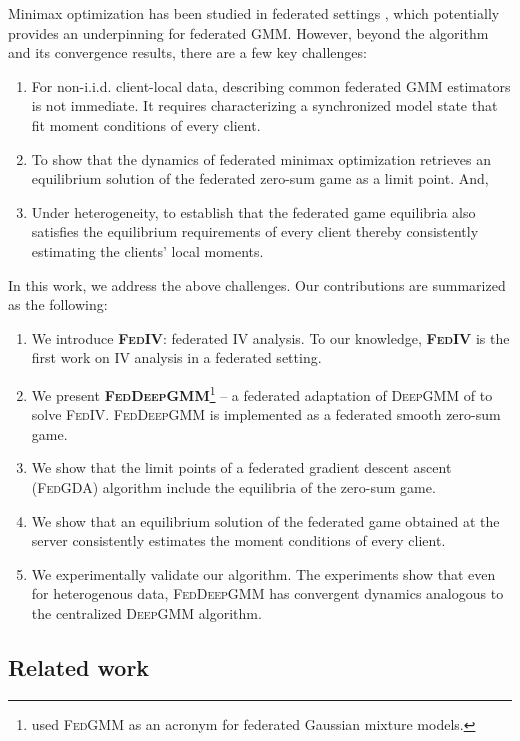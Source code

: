 \documentclass{article}
\let\cite\relax
\newcommand*{\cite}{\citep}
\newcommand{\fv}{\textsc{FedIV}\xspace}
\newcommand{\dgmm}{\textsc{DeepGMM}\xspace}
\newcommand{\fdgmm}{\textsc{FedDeepGMM}\xspace}
\newcommand{\fgda}{\textsc{FedGDA}\xspace}
\theoremstyle{definition}
\begin{document}
Minimax optimization has been studied in federated settings \cite{sharma2022federated, wu2024solving}, which potentially provides an underpinning for federated GMM. However, beyond the algorithm and its convergence results, there are a few key challenges: 
\begin{enumerate}[label=(\Alph*),parsep=0pt,topsep=0pt,leftmargin=*,itemsep=0pt]
\item For non-i.i.d. client-local data, describing common federated GMM estimators is not immediate. It requires characterizing a synchronized model state that fit moment conditions of every client.
\item To show that the dynamics of federated minimax optimization retrieves an equilibrium solution of the federated zero-sum game as a limit point. And, 
\item Under heterogeneity, to establish that the federated game equilibria also satisfies the equilibrium requirements of every client thereby consistently estimating the clients' local moments.  
\end{enumerate}
In this work, we address the above challenges. Our contributions are summarized as the following:
\begin{enumerate}[parsep=0pt,topsep=0pt,leftmargin=*,itemsep=0pt]
	\item We introduce \textbf{\fv}: federated IV analysis. To our knowledge, \textbf{\fv} is the first work on IV analysis in a federated setting. 
	\item We present \textbf{\fdgmm}\footnote{\citet{wu2023personalized} used \textsc{FedGMM} as an acronym for federated Gaussian mixture models.} -- a federated adaptation of \dgmm of \citet{bennett2019deep} to solve \fv. \fdgmm is implemented as a federated smooth zero-sum game.
	\item We show that the limit points of a federated gradient descent ascent (\fgda) algorithm include the equilibria of the zero-sum game. 
    \item We show that an equilibrium solution of the federated game obtained at the server consistently estimates the moment conditions of every client.  	
	\item We experimentally validate our algorithm. The experiments show that even for heterogenous data, \fdgmm has convergent dynamics analogous to the centralized \dgmm algorithm.   
\end{enumerate} 

\subsection{Related work}
\end{document}
